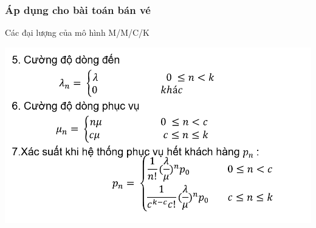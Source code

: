 \documentclass[10pt]{beamer}
\begin{document}
\begin{frame}
	\frametitle{Áp dụng cho bài toán bán vé}
	\begin{block}{Các đại lượng của mô hình M/M/C/K}
\begin{center}
    \includegraphics[scale=.5]{img/mmck.2.PNG}
\end{center}

\end{block}
\end{frame}
\end{document}

